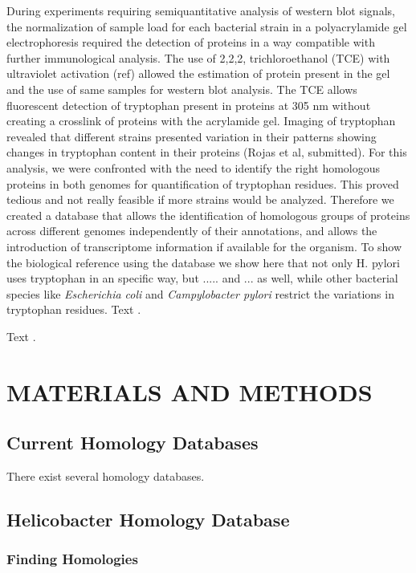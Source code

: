 \documentclass[a4,center,fleqn]{NAR}
\begin{document}
During experiments requiring semiquantitative analysis of western blot signals, the normalization of sample load for each bacterial strain in a polyacrylamide gel electrophoresis required the detection of proteins in a way compatible with further immunological analysis. The use of 2,2,2, trichloroethanol (TCE) with ultraviolet activation (ref) allowed the estimation of protein present in the gel and the use of  same samples for western blot analysis. The TCE allows fluorescent detection of tryptophan present in proteins at 305 nm without creating a crosslink of proteins with the acrylamide gel. Imaging of tryptophan revealed that different strains presented variation in their patterns showing changes in tryptophan content in their proteins (Rojas et al, submitted). For this analysis, we were confronted with the need to identify the right homologous proteins in both genomes for quantification of tryptophan residues. This proved tedious and not really feasible if more strains would be analyzed. Therefore we created a database that allows the identification of homologous groups of proteins across different genomes independently of their annotations, and allows the introduction of transcriptome information if available for the organism. To show the biological reference using the database we show here that not only H. pylori uses tryptophan in an specific way, but ..... and ... as well, while other bacterial species like \textit{Escherichia coli} and \textit{Campylobacter pylori} restrict the variations in tryptophan residues.
Text \cite{2,3}.

Text \cite{4}.


\section{MATERIALS AND METHODS}

\subsection{Current Homology Databases}

There exist several homology databases.


\subsection{Helicobacter Homology Database}


\subsubsection{Finding Homologies}
\end{document}
